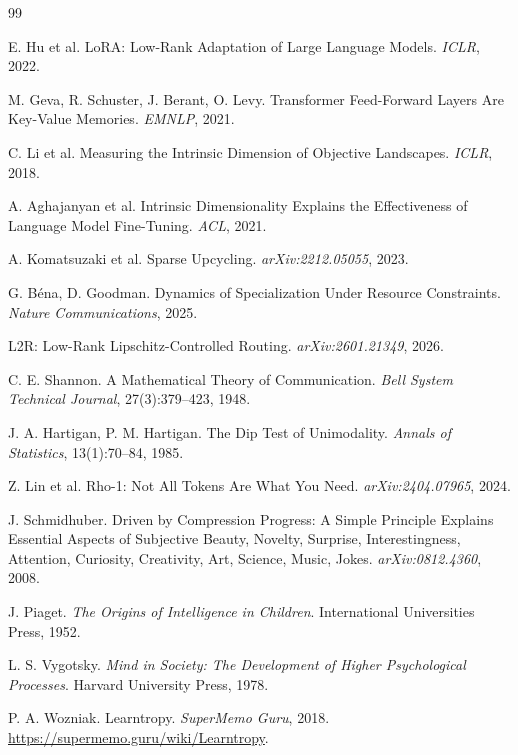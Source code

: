 \documentclass{article}
\begin{document}
\begin{thebibliography}{99}

 E. Hu et al. LoRA: Low-Rank Adaptation of Large Language Models. \textit{ICLR}, 2022.

 M. Geva, R. Schuster, J. Berant, O. Levy. Transformer Feed-Forward Layers Are Key-Value Memories. \textit{EMNLP}, 2021.

 C. Li et al. Measuring the Intrinsic Dimension of Objective Landscapes. \textit{ICLR}, 2018.

 A. Aghajanyan et al. Intrinsic Dimensionality Explains the Effectiveness of Language Model Fine-Tuning. \textit{ACL}, 2021.

 A. Komatsuzaki et al. Sparse Upcycling. \textit{arXiv:2212.05055}, 2023.

 G. B\'{e}na, D. Goodman. Dynamics of Specialization Under Resource Constraints. \textit{Nature Communications}, 2025.

 L2R: Low-Rank Lipschitz-Controlled Routing. \textit{arXiv:2601.21349}, 2026.

 C. E. Shannon. A Mathematical Theory of Communication. \textit{Bell System Technical Journal}, 27(3):379--423, 1948.

 J. A. Hartigan, P. M. Hartigan. The Dip Test of Unimodality. \textit{Annals of Statistics}, 13(1):70--84, 1985.

 Z. Lin et al. Rho-1: Not All Tokens Are What You Need. \textit{arXiv:2404.07965}, 2024.

 J. Schmidhuber. Driven by Compression Progress: A Simple Principle Explains Essential Aspects of Subjective Beauty, Novelty, Surprise, Interestingness, Attention, Curiosity, Creativity, Art, Science, Music, Jokes. \textit{arXiv:0812.4360}, 2008.

 J. Piaget. \textit{The Origins of Intelligence in Children}. International Universities Press, 1952.

 L. S. Vygotsky. \textit{Mind in Society: The Development of Higher Psychological Processes}. Harvard University Press, 1978.

 P. A. Wozniak. Learntropy. \textit{SuperMemo Guru}, 2018. \url{https://supermemo.guru/wiki/Learntropy}.


\end{thebibliography}
\end{document}

